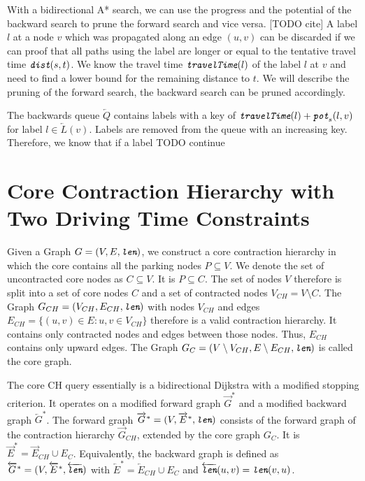 With a bidirectional A* search, we can use the progress and the potential of the backward search to prune the forward search and vice versa. [TODO cite] A label $l$ at a node $v$ which was propagated along an edge $(u,v)$ can be discarded if we can proof that all paths using the label are longer or equal to the tentative travel time $\texttt{\itshape dist}(s,t)$. We know the travel time $\texttt{\itshape travelTime}(l)$ of the label $l$ at $v$ and need to find a lower bound for the remaining distance to $t$. We will describe the pruning of the forward search, the backward search can be pruned accordingly.

The backwards queue $\overleftarrow{Q}$ contains labels with a key of $\texttt{\itshape travelTime}(l) + \texttt{\itshape pot}_s(l,v)$ for label $l \in \overleftarrow{L}(v)$. Labels are removed from the queue with an increasing key. Therefore, we know that if a label  TODO continue

\section{Core Contraction Hierarchy with Two Driving Time Constraints}
Given a Graph $G = (V,E,\texttt{\itshape len})$, we construct a core contraction hierarchy in which the core contains all the parking nodes $P \subseteq V$. We denote the set of uncontracted core nodes as $C \subseteq V$. It is $P \subseteq C$. The set of nodes $V$ therefore is split into a set of core nodes $C$ and a set of contracted nodes $V_{CH} = V \setminus C$. The Graph $G_{CH} = (V_{CH},E_{CH},\texttt{\itshape len})$ with nodes $V_{CH}$ and edges $E_{CH} = \{(u,v) \in E : u,v \in V_{CH}\}$ therefore is a valid contraction hierarchy. It contains only contracted nodes and edges between those nodes. Thus, $E_{CH}$ contains only upward edges. The Graph $G_{C} = (V \setminus V_{CH},E \setminus E_{CH},\texttt{\itshape len})$ is called the core graph.

The core CH query essentially is a bidirectional Dijkstra with a modified stopping criterion. It operates on a modified forward graph $\overrightarrow{G}^*$ and a modified backward graph $\overleftarrow{G}^*$. The forward graph $\overrightarrow{G}^* = (V,\overrightarrow{E}^*,\texttt{\itshape len})$ consists of the forward graph of the contraction hierarchy $\overrightarrow{G}_{CH}$, extended by the core graph $G_C$. It is $\overrightarrow{E}^* = \overrightarrow{E}_{CH} \cup E_C $. Equivalently, the backward graph is defined as $\overleftarrow{G}^* = (V,\overleftarrow{E}^*,\overleftarrow{\texttt{\itshape len}})$ with $\overleftarrow{E}^* = \overleftarrow{E}_{CH} \cup E_C$ and $\overleftarrow{\texttt{\itshape len}}(u,v) = \texttt{\itshape len}(v,u)$.

